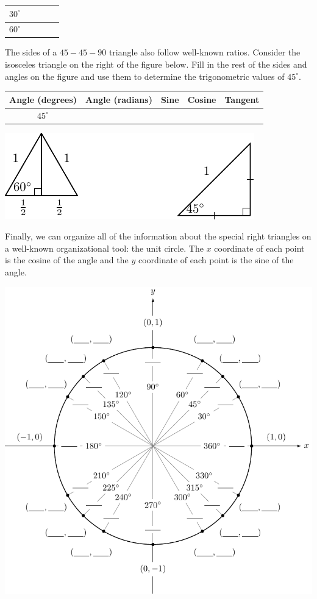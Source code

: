 \begin{activity}
\begin{center}
\begin{tabular}{|c|c||c|c|c|}
                    \hline
                    $30^\circ$ & & & & \\ \hline
                    $60^\circ$ & & & & \\ \hline
                \end{tabular}
            \end{center}
        \item The sides of a $45-45-90$ triangle also follow well-known ratios.  Consider
            the isosceles triangle on the right of the figure below.  Fill in the rest of
            the sides and angles on the figure and use them to determine the trigonometric
            values of $45^\circ$.
            \begin{center}
                \begin{tabular}{|c|c||c|c|c|}
                    \hline
                    Angle (degrees) & Angle (radians) & Sine & Cosine & Tangent \\ \hline
                    \hline
                    $45^\circ$ & & & & \\ \hline
                \end{tabular}
            \end{center}
    \begin{center}
        \includegraphics[width=0.5\columnwidth]{figures/0-5-fig_specialright.pdf}
    \end{center}
        \item Finally, we can organize all of the information about the special right
            triangles on a well-known organizational tool: the unit circle.  The $x$
            coordinate of each point is the cosine of the angle and the $y$ coordinate of
            each point is the sine of the angle.  
    \begin{center}
        \includegraphics[width=0.7\columnwidth]{figures/0-5-UnitCircle.pdf}
    \end{center}
    \ea

\end{activity}
